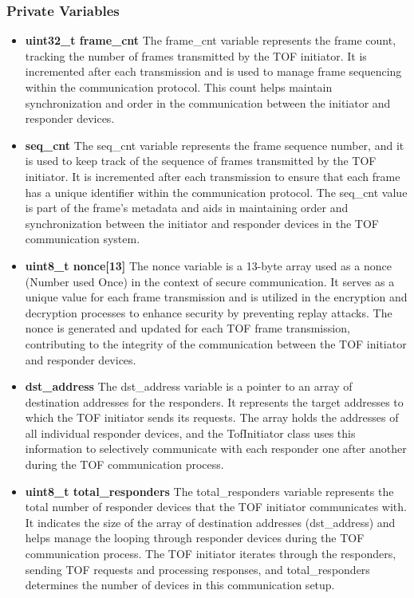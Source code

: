 \subsubsection{Private Variables}
\begin{itemize}
	\item \textbf{uint32\_t frame\_cnt}
	\newline
	The frame\_cnt variable represents the frame count, tracking the number of frames transmitted by the TOF initiator. 
	It is incremented after each transmission and is used to manage frame sequencing within the communication protocol. 
	This count helps maintain synchronization and order in the communication between the initiator and responder devices.
	
	\item \textbf{seq\_cnt}
	\newline
	The seq\_cnt variable represents the frame sequence number, and it is used to keep track of the sequence of frames transmitted by the TOF initiator. 
	It is incremented after each transmission to ensure that each frame has a unique identifier within the communication protocol. 
	The seq\_cnt value is part of the frame's metadata and aids in maintaining order and synchronization between the initiator and responder devices in the TOF communication system.
	
	\item \textbf{uint8\_t nonce[13]}
	\newline
	The nonce variable is a 13-byte array used as a nonce (Number used Once) in the context of secure communication. 
	It serves as a unique value for each frame transmission and is utilized in the encryption and decryption processes to enhance security by preventing replay attacks. 
	The nonce is generated and updated for each TOF frame transmission, contributing to the integrity of the communication between the TOF initiator and responder devices.
	
	\item \textbf{dst\_address}
	\newline
	The dst\_address variable is a pointer to an array of destination addresses for the responders. 
	It represents the target addresses to which the TOF initiator sends its requests. 
	The array holds the addresses of all individual responder devices, and the TofInitiator class uses this information to selectively communicate with each responder one after another during the TOF communication process.
	
	\item \textbf{uint8\_t total\_responders}
	\newline
	The total\_responders variable represents the total number of responder devices that the TOF initiator communicates with. 
	It indicates the size of the array of destination addresses (dst\_address) and helps manage the looping through responder devices during the TOF communication process. 
	The TOF initiator iterates through the responders, sending TOF requests and processing responses, and total\_responders determines the number of devices in this communication setup.
	

\end{itemize}
